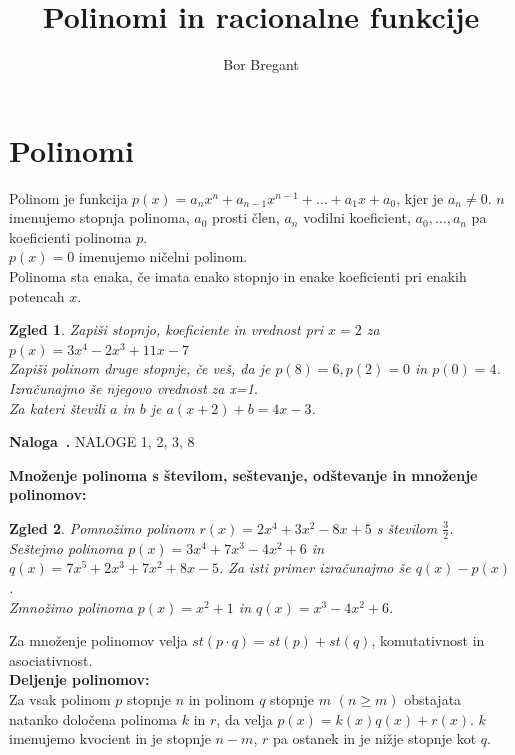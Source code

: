 \documentclass{article}
\title{Polinomi in racionalne funkcije}
\author{Bor Bregant}
\date{\vspace{-5ex}}
\newcounter{example}[section]
\newenvironment{example}[1][]{\refstepcounter{example}\par\medskip
   \noindent \textbf{Naloga~\theexample. #1} \rmfamily}{\medskip}
\newtheorem*{zgled}{Zgled}
\begin{document}
\maketitle


\section{Polinomi}

Polinom je funkcija $p(x)=a_n x^n+a_{n-1}x^{n-1}+\ldots+a_1 x+a_0$, kjer je $a_n\neq 0$. $n$ imenujemo stopnja polinoma, $a_0$ prosti člen, $a_n$ vodilni koeficient, $a_0,\ldots,a_n$ pa koeficienti polinoma $p$.\\
$p(x)=0$ imenujemo ničelni polinom.\\
Polinoma sta enaka, če imata enako stopnjo in enake koeficienti pri enakih potencah $x$.

\begin{zgled}
    Zapiši stopnjo, koeficiente in vrednost pri $x=2$ za $p(x)=3x^4-2x^3+11x-7$\\
    Zapiši polinom druge stopnje, če veš, da je $p(8)=6, p(2)=0$ in $p(0)=4$. Izračunajmo še njegovo vrednost za x=1.\\
    Za kateri števili $a$ in $b$ je $a(x+2)+b=4x-3$.
\end{zgled}

\begin{example}
    NALOGE 1, 2, 3, 8
\end{example}

\textbf{Množenje polinoma s številom, seštevanje, odštevanje in množenje polinomov:}
\begin{zgled}
    Pomnožimo polinom $r(x)=2x^4+3x^2-8x+5$ s številom $\frac{3}{2}$.\\
    Seštejmo polinoma $p(x)=3x^4+7x^3-4x^2+6$ in $q(x)=7x^5+2x^3+7x^2+8x-5$. Za isti primer izračunajmo še $q(x)-p(x)$.\\
    Zmnožimo polinoma $p(x)=x^2+1$ in $q(x)=x^3-4x^2+6$.
\end{zgled}
Za množenje polinomov velja $st(p\cdot q)=st(p)+st(q)$, komutativnost in asociativnost.\\

\textbf{Deljenje polinomov:}\\

Za vsak polinom $p$ stopnje $n$ in polinom $q$ stopnje $m$ $(n\geq m)$ obstajata natanko določena polinoma $k$ in $r$, da velja $p(x)=k(x)q(x)+r(x)$. $k$ imenujemo kvocient in je stopnje $n-m$, $r$ pa ostanek in je nižje stopnje kot $q$.
\end{document}
